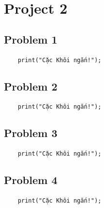 \documentclass[a4paper]{article}
\numberwithin{equation}{section}
\begin{document}
\newpage
\section{Project 2}
\subsection{Problem 1}

\begin{mdframed}[leftline=false,rightline=false,backgroundcolor=magenta!10,nobreak=true]
  \begin{verbatim}
    print("Cặc Khôi ngắn!");
  \end{verbatim}
\end{mdframed}

\newpage
\subsection{Problem 2}

\begin{mdframed}[leftline=false,rightline=false,backgroundcolor=magenta!10,nobreak=true]
  \begin{verbatim}
    print("Cặc Khôi ngắn!");
  \end{verbatim}
\end{mdframed}

\newpage
\subsection{Problem 3}

\begin{mdframed}[leftline=false,rightline=false,backgroundcolor=magenta!10,nobreak=true]
  \begin{verbatim}
    print("Cặc Khôi ngắn!");
  \end{verbatim}
\end{mdframed}

\newpage
\subsection{Problem 4}

\begin{mdframed}[leftline=false,rightline=false,backgroundcolor=magenta!10,nobreak=true]
  \begin{verbatim}
    print("Cặc Khôi ngắn!");
  \end{verbatim}
\end{mdframed}
\end{document}
